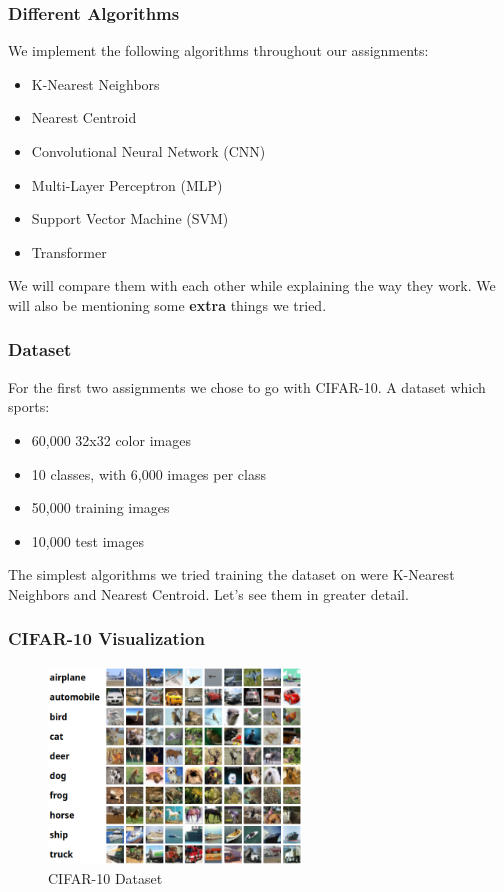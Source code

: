 \begin{frame}
    \frametitle{Different Algorithms}
    We implement the following algorithms throughout our assignments:
    \begin{itemize}
        \item K-Nearest Neighbors
        \item Nearest Centroid
        \item Convolutional Neural Network (CNN)
        \item Multi-Layer Perceptron (MLP)
        \item Support Vector Machine (SVM)
        \item Transformer
    \end{itemize}
    We will compare them with each other while explaining the way they work. We will also 
    be mentioning some \textbf{extra} things we tried.
\end{frame}

\begin{frame}
    \frametitle{Dataset}
    For the first two assignments we chose to go with CIFAR-10. A dataset which sports:
    \begin{itemize}
        \item 60,000 32x32 color images
        \item 10 classes, with 6,000 images per class
        \item 50,000 training images 
        \item 10,000 test images
    \end{itemize}
    The simplest algorithms we tried training the dataset on were K-Nearest Neighbors and 
    Nearest Centroid. Let's see them in greater detail.
\end{frame}

\begin{frame}
    \frametitle{CIFAR-10 Visualization}
    \begin{figure}
        \centering
        \includegraphics[width=0.6\textwidth]{media/1stAssignment/cifar10_example.png}
        \caption{CIFAR-10 Dataset}
    \end{figure}
\end{frame}

